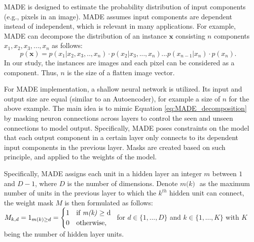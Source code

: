 \documentclass[journal]{IEEEtai}
\begin{document}
MADE is designed to estimate the probability distribution of input components (e.g., pixels in an image). MADE assumes input components are dependent instead of independent, which is relevant in many applications. For example, MADE can decompose the distribution of an instance $\textbf{x}$ consisting $n$ components $x_1, x_2, x_3, ..., x_n$ as follows:
\begin{equation}
	\label{eq:MADE_decomposition}
   p(\mathbf{x}) =   p(x_1|x_2,x_3,..,x_n) \cdot p(x_2|x_3,...,x_n) 
					...p(x_{n-1}|x_n) \cdot p(x_n). 
\end{equation} In our study, the instances are images and each pixel can be considered as a component. Thus, $n$ is the size of a flatten image vector. 
 
For MADE implementation, a shallow neural network is utilized. Its input and output size are equal (similar to an Autoencoder), for example a size of $n$ for the above example. The main idea is to mimic Equation \ref{eq:MADE_decomposition} by masking neuron connections across layers to control the seen and unseen connections to model output. Specifically, MADE poses constraints on the model that each output component in a certain layer only connects to its dependent input components in the previous layer. Masks are created based on such principle, and applied to the weights of the model.

Specifically, MADE assigns each unit in a hidden layer an integer $\textit{m}$ between $1$ and $D-1$, where $D$ is the number of dimensions. Denote $\textit{m(k) } $ as the maximum number of units in the previous layer to which the $\textit{k}^{th}$ hidden unit can connect, the weight mask $M$ is then formulated as follows:
$
 M_{k,d} = 1_{m(k) \geq d} = 
				 \begin{cases}
				  1 & \text{if \textit{m(k)} $\geq$ d }\\
				  0 & \text{otherwise,}
			 \end{cases} 
$
for $d \in \{1,...,D\}$ and $k \in \{1,...,K \}$ with $K$ being the number of hidden layer units.
 
\end{document}
